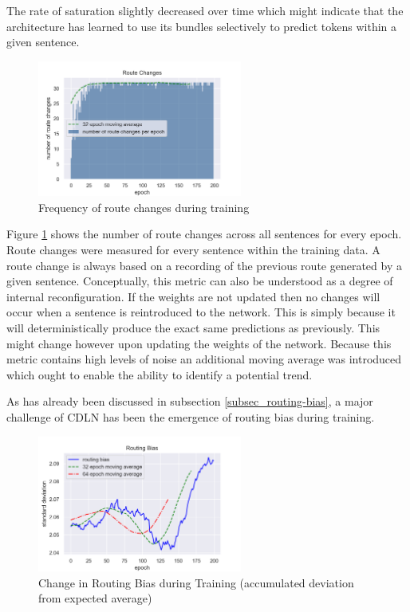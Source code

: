 The rate of saturation slightly decreased over time
which might indicate that the architecture has learned
to use its bundles selectively to 
predict tokens within a given sentence.
 
\clearpage

\begin{figure}
  \centering 
  \includegraphics[width=0.60\textwidth]{PICs/Results/route-changes.png}
  \caption{Frequency of route changes during training}
  \label{results-route-changes}
\end{figure}
 
  

Figure \ref{results-route-changes} shows the number
of route changes across all sentences for every epoch.
Route changes were measured for every sentence within the training data. A route change is always based on a recording of the previous route generated by a given sentence.
Conceptually, this metric can also be understood
as a degree of internal reconfiguration.
If the weights are not updated then no changes will
occur when a sentence is reintroduced to the network.
This is simply because it will deterministically produce the exact same predictions as previously.
This might change however upon updating the weights of the network.
Because this metric contains high levels of noise
an additional moving average was introduced
which ought to enable the ability to identify a 
potential trend.\break

As has already been discussed in subsection \ref{subsec_routing-bias}, a major
challenge of \acs{CDLN} has been the emergence of routing
bias during training. 

\begin{figure}
  \centering 
  \includegraphics[width=0.60\textwidth]{PICs/Results/routing-bias.png}
  \caption{Change in Routing Bias during Training \break (accumulated deviation from expected average)}
  \label{results-routing-bias}
\end{figure}


